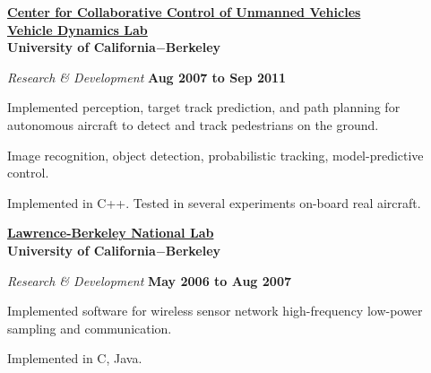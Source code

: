\href{http://c3uv.berkeley.edu/}{\textbf{Center for Collaborative Control of Unmanned Vehicles}}\\
\href{http://vehicle.me.berkeley.edu/}{\textbf{Vehicle Dynamics Lab}}\\
\textbf{University of California$-$Berkeley}
\begin{outerlist}
\item[] \textit{Research \& Development}%
        \hfill \textbf{Aug 2007 to Sep 2011}
\begin{innerlist}
\item Implemented perception, target track prediction, and path planning for autonomous aircraft to detect and track pedestrians on the ground.
\item Image recognition, object detection, probabilistic tracking, model-predictive control.
\item Implemented in C++. Tested in several experiments on-board real aircraft.
\end{innerlist}
\end{outerlist}

\halfblankline

\href{http://www.lbl.gov/}{\textbf{Lawrence-Berkeley National Lab}}\\
\textbf{University of California$-$Berkeley}
\begin{outerlist}
\item[] \textit{Research \& Development}%
        \hfill \textbf{May 2006 to Aug 2007}
\begin{innerlist}
\item Implemented software for wireless sensor network high-frequency low-power sampling and communication.
\item Implemented in C, Java.
\end{innerlist}
\end{outerlist}


